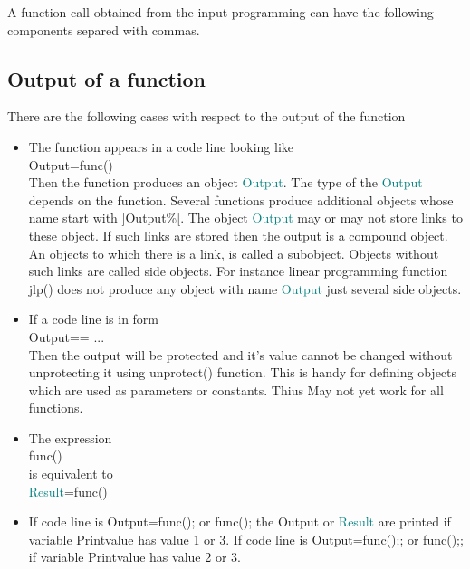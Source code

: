 { 
A function call obtained from the  input programming can have the 
following components separed with commas. 
\subsection{Output of a function} 
\label{output} 
 
There are the following cases with respect to 
the output of the function 
 
\begin{itemize} 
 
\item The function appears in a code line looking like\\ 
Output=func()\\ 
Then the function produces an object \textcolor{teal}{Output}. The type of the \textcolor{teal}{Output} depends on the function. 
Several functions produce additional objects whose name start with ]Output\%[. The 
object \textcolor{teal}{Output} may or may not store links to these object. If such links are 
stored then the output is a compound object. An objects to which there is a link, is called a subobject. 
Objects without such links are called side objects. For instance linear programming function \textcolor{VioletRed}{jlp}() 
does not produce any object with name \textcolor{teal}{Output} just several side objects. 
 
\item If a code line is in form \\ 
Output== ...\\ 
Then the output will be protected and it's value cannot be changed without 
unprotecting it using \textcolor{VioletRed}{unprotect}() function. This is handy for defining objects 
which are used as parameters or constants. Thius May not yet work for all functions. 
 
\item The expression \\ 
func()\\ 
is equivalent to\\ 
\textcolor{teal}{Result}=func() 
\item If code line is Output=func(); or func(); the Output or \textcolor{teal}{Result} are printed if 
variable Printvalue has value 1 or 3.  If code line is Output=func();; or func();; 
if variable Printvalue has value 2 or 3. 
 

\end{itemize}}
